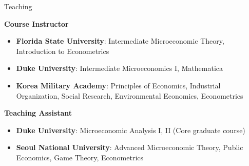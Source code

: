 \begin{rSection}{Teaching}
	
	
	\textbf{Course Instructor}	
	\begin{itemize}
		\item[] \textbf{Florida State University}: Intermediate Microeconomic Theory, Introduction to Econometrics
		\item[] \textbf{Duke University}: Intermediate Microeconomics I, Mathematica 
		\item[] \textbf{Korea Military Academy}: Principles of Economics, Industrial Organization, Social Research, Environmental Economics, Econometrics 
	\end{itemize}
	
	\textbf{Teaching Assistant}
	\begin{itemize}
		\item[] \textbf{Duke University}: Microeconomic Analysis I, II (Core graduate course) 
		\item[] \textbf{Seoul National University}: Advanced Microeconomic Theory, Public Economics, Game Theory, Econometrics
	\end{itemize}
	
	
	\begin{comment}
		\textbf{Duke University} \hfill { \textbf{Teaching Assistant}}
		
		\hspace*{20pt}	Microeconomic Analysis I, II (Graduate Level) 
		
		\smallskip
		\textbf{Korea Military Academy} \hfill { \textbf{Lecturer}}
		
		\hspace*{20pt} Principles of Economics,
		Industrial Organization,
		Social Research,
		
		\hspace*{20pt}		Environmental Economics,
		Econometrics 
		
		\smallskip
		\textbf{Seoul National University} \hfill {\textbf{Teaching Assistant} }
		
		\hspace*{20pt} Advanced Microeconomic Theory,
		Public Economics, 
		Game Theory, 
		Econometrics 
	\end{comment}
	
	
	
	
\end{rSection}
\medskip

